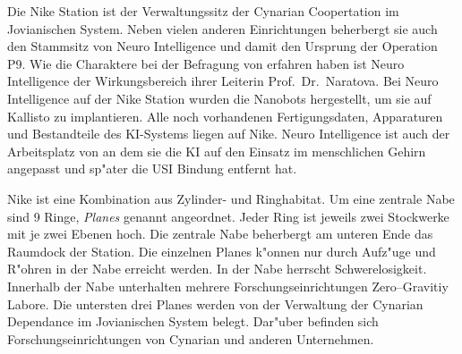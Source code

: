 
Die Nike Station ist der Verwaltungssitz der Cynarian Coopertation im Jovianischen System. Neben vielen anderen Einrichtungen beherbergt sie auch den Stammsitz von Neuro Intelligence und damit den Ursprung der Operation P9. Wie die Charaktere bei der Befragung von \ml{} erfahren haben ist Neuro Intelligence der Wirkungsbereich ihrer Leiterin Prof.~Dr.~Naratova. Bei Neuro Intelligence auf der Nike Station wurden die Nanobots hergestellt, um sie auf Kallisto zu implantieren. Alle noch vorhandenen Fertigungsdaten, Apparaturen und Bestandteile des KI-Systems liegen auf Nike. Neuro Intelligence ist auch der Arbeitsplatz von \ml{} an dem sie die KI auf den Einsatz im menschlichen Gehirn angepasst und sp"ater die USI Bindung entfernt hat.

Nike ist eine Kombination aus Zylinder- und Ringhabitat. Um eine zentrale Nabe sind 9 Ringe, \emph{Planes} genannt angeordnet. Jeder Ring ist jeweils zwei Stockwerke mit je zwei Ebenen hoch. Die zentrale Nabe beherbergt am unteren Ende das Raumdock der Station.  Die einzelnen Planes k"onnen nur durch Aufz"uge und R"ohren in der Nabe erreicht werden. In der Nabe herrscht Schwerelosigkeit. Innerhalb der Nabe unterhalten mehrere Forschungseinrichtungen Zero--Gravitiy Labore. Die untersten drei Planes werden von der Verwaltung der Cynarian Dependance im Jovianischen System belegt. Dar"uber befinden sich Forschungseinrichtungen von Cynarian und anderen Unternehmen.

